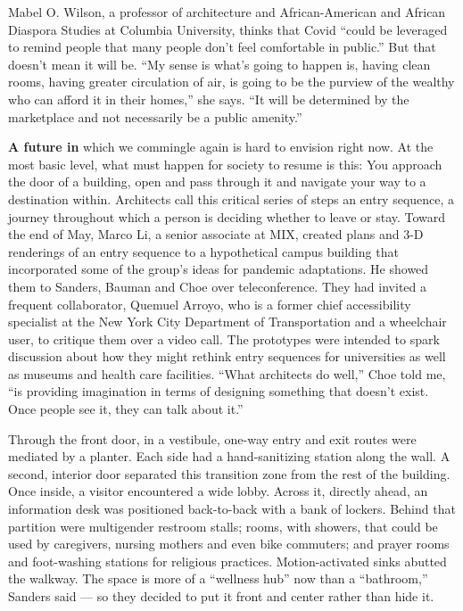 Mabel O. Wilson, a professor of architecture and African-American and
African Diaspora Studies at Columbia University, thinks that Covid
``could be leveraged to remind people that many people don't feel
comfortable in public.'' But that doesn't mean it will be. ``My sense is
what's going to happen is, having clean rooms, having greater
circulation of air, is going to be the purview of the wealthy who can
afford it in their homes,'' she says. ``It will be determined by the
marketplace and not necessarily be a public amenity.''

\textbf{A future in} which we commingle again is hard to envision right
now. At the most basic level, what must happen for society to resume is
this: You approach the door of a building, open and pass through it and
navigate your way to a destination within. Architects call this critical
series of steps an entry sequence, a journey throughout which a person
is deciding whether to leave or stay. Toward the end of May, Marco Li, a
senior associate at MIX, created plans and 3-D renderings of an entry
sequence to a hypothetical campus building that incorporated some of the
group's ideas for pandemic adaptations. He showed them to Sanders,
Bauman and Choe over teleconference. They had invited a frequent
collaborator, Quemuel Arroyo, who is a former chief accessibility
specialist at the New York City Department of Transportation and a
wheelchair user, to critique them over a video call. The prototypes were
intended to spark discussion about how they might rethink entry
sequences for universities as well as museums and health care
facilities. ``What architects do well,'' Choe told me, ``is providing
imagination in terms of designing something that doesn't exist. Once
people see it, they can talk about it.''

Through the front door, in a vestibule, one-way entry and exit routes
were mediated by a planter. Each side had a hand-sanitizing station
along the wall. A second, interior door separated this transition zone
from the rest of the building. Once inside, a visitor encountered a wide
lobby. Across it, directly ahead, an information desk was positioned
back-to-back with a bank of lockers. Behind that partition were
multigender restroom stalls; rooms, with showers, that could be used by
caregivers, nursing mothers and even bike commuters; and prayer rooms
and foot-washing stations for religious practices. Motion-activated
sinks abutted the walkway. The space is more of a ``wellness hub'' now
than a ``bathroom,'' Sanders said --- so they decided to put it front
and center rather than hide it.

